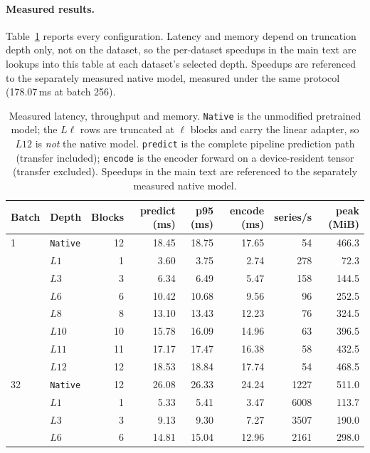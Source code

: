 \paragraph{Measured results.}
Table~\ref{tab:latency-full} reports every configuration. Latency and memory depend on
truncation depth only, not on the dataset, so the per-dataset speedups in the main text are
lookups into this table at each dataset's selected depth. Speedups are referenced to the separately measured native model, measured under the same protocol (178.07\,ms at batch 256).

\begin{table}[t]
    \centering
    \small
    \caption{Measured latency, throughput and memory. \texttt{Native} is the unmodified pretrained model; the \(L\ell\) rows are truncated at $\ell$ blocks and carry the linear adapter, so \(L12\) is \emph{not} the native model. \texttt{predict} is the complete pipeline prediction path (transfer included); \texttt{encode} is the encoder forward on a device-resident tensor (transfer excluded). Speedups in the main text are referenced to the separately measured native model.}
    \label{tab:latency-full}
    \begin{tabular}{llrrrrrr}
        \toprule
        Batch & Depth & Blocks & predict (ms) & p95 (ms) & encode (ms) & series/s & peak (MiB) \\
        \midrule
        1 & \texttt{Native} & 12 & 18.45 & 18.75 & 17.65 & 54 & 466.3 \\
         & \(L1\) & 1 & 3.60 & 3.75 & 2.74 & 278 & 72.3 \\
         & \(L3\) & 3 & 6.34 & 6.49 & 5.47 & 158 & 144.5 \\
         & \(L6\) & 6 & 10.42 & 10.68 & 9.56 & 96 & 252.5 \\
         & \(L8\) & 8 & 13.10 & 13.43 & 12.23 & 76 & 324.5 \\
         & \(L10\) & 10 & 15.78 & 16.09 & 14.96 & 63 & 396.5 \\
         & \(L11\) & 11 & 17.17 & 17.47 & 16.38 & 58 & 432.5 \\
         & \(L12\) & 12 & 18.53 & 18.84 & 17.74 & 54 & 468.5 \\
        \midrule
        32 & \texttt{Native} & 12 & 26.08 & 26.33 & 24.24 & 1227 & 511.0 \\
         & \(L1\) & 1 & 5.33 & 5.41 & 3.47 & 6008 & 113.7 \\
         & \(L3\) & 3 & 9.13 & 9.30 & 7.27 & 3507 & 190.0 \\
         & \(L6\) & 6 & 14.81 & 15.04 & 12.96 & 2161 & 298.0 \\

\end{tabular}
\end{table}
